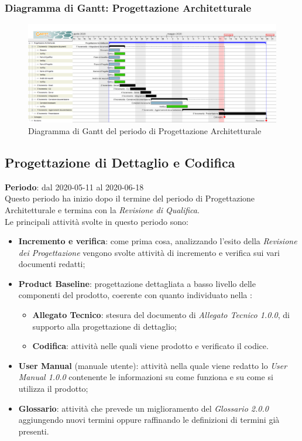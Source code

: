 	\subsubsection{Diagramma di Gantt: Progettazione Architetturale}
		\begin{figure}[h]
			\centering
			\includegraphics[width=1.1\textwidth]{./res/img/DiagrammiGantt/prog_arch_gantt.png}
			\caption{Diagramma di Gantt del periodo di Progettazione Architetturale}
		\end{figure}
\newpage

\subsection{Progettazione di Dettaglio e Codifica}
\textbf{Periodo}: dal 2020-05-11 al 2020-06-18 \\
Questo periodo ha inizio dopo il termine del periodo di Progettazione Architetturale e termina con la \textit{Revisione di Qualifica}. \\

Le principali attività svolte in questo periodo sono:
\begin{itemize}
	\item \textbf{Incremento e verifica}: come prima cosa, analizzando l'esito della \textit{Revisione dei Progettazione} vengono svolte attività di incremento e verifica sui vari documenti redatti;
	\item \textbf{Product Baseline}: progettazione dettagliata a basso livello delle componenti del prodotto, coerente con quanto individuato nella \TB{}:
	\begin{itemize}
		\item \textbf{Allegato Tecnico}: stesura del documento di \textit{Allegato Tecnico 1.0.0}, di supporto alla progettazione di dettaglio;
		\item \textbf{Codifica}: attività nelle quali viene prodotto e verificato il codice.
	\end{itemize}
	\item \textbf{User Manual} (manuale utente): attività nella quale viene redatto lo \textit{User Manual 1.0.0} contenente le informazioni su come funziona e su come si utilizza il prodotto;
	\item \textbf{Glossario}: attività che prevede un miglioramento del \textit{Glossario 2.0.0} aggiungendo nuovi termini oppure raffinando le definizioni di termini già presenti.
\end{itemize}

